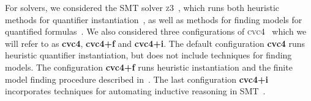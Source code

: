 \documentclass[runningheads,a4paper]{llncs}
\newcommand{\cvc}{\textsc{cvc}{\small 4}\xspace}
\newcommand{\ziii}{\textsc{z}{\small 3}\xspace}
\begin{document}
For solvers, we considered the SMT solver \ziii~\cite{de-moura-bjoerner-2008}, 
which runs both heuristic methods for quantifier instantiation~\cite{DBLP:conf/cade/MouraB07},
as well as methods for finding models for quantified formulas~\cite{GeDeM-CAV-09}.
We also considered three configurations of \cvc~\cite{barrett-et-al-2011} which we will refer to as {\bf cvc4}, {\bf cvc4+f} and {\bf cvc4+i}.
The default configuration {\bf cvc4} runs heuristic quantifier instantiation, 
but does not include techniques for finding models.
The configuration {\bf cvc4+f} runs heuristic instantiation and the finite model finding procedure described in~\cite{ReyEtAl-1-RR-13, reynolds-et-al-2013}.
The last configuration {\bf cvc4+i} incorporates techniques for automating inductive reasoning in SMT~\cite{reynolds-kuncak-2015}.
\end{document}
